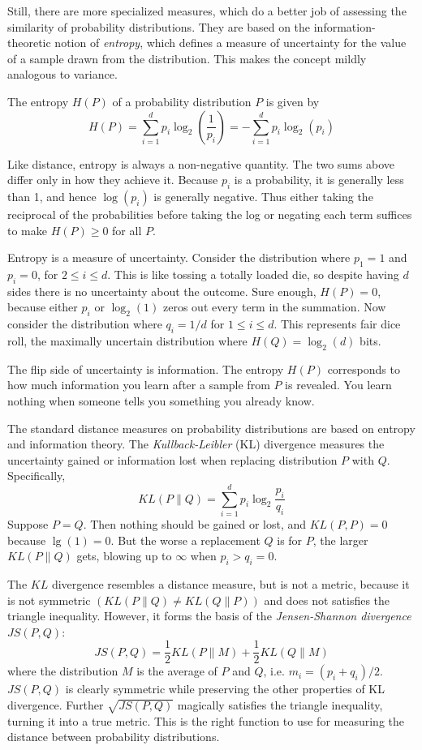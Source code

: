 \documentclass[10pt]{article}
\begin{document}
Still, there are more specialized measures, which do a better job of assessing the similarity of probability distributions. They are based on the information-theoretic notion of \textit{entropy}, which defines a measure of uncertainty for the value of a sample drawn from the distribution. This makes the concept mildly analogous to variance.

The entropy $H(P)$ of a probability distribution $P$ is given by
\[
H(P)=\sum_{i=1}^{d} p_i \log_2\left(\frac{1}{p_i}\right)=-\sum_{i=1}^{d} p_i \log_2(p_i)
\]

Like distance, entropy is always a non-negative quantity. The two sums above differ only in how they achieve it. Because $p_i$ is a probability, it is generally less than 1, and hence $\log(p_i)$ is generally negative. Thus either taking the reciprocal of the probabilities before taking the log or negating each term suffices to make $H(P) \geq 0$ for all $P$.

Entropy is a measure of uncertainty. Consider the distribution where $p_1=1$ and $p_i=0$, for $2 \leq i \leq d$. This is like tossing a totally loaded die, so despite having $d$ sides there is no uncertainty about the outcome. Sure enough, $H(P)=0$, because either $p_i$ or $\log_2(1)$ zeros out every term in the summation. Now consider the distribution where $q_i=1/d$ for $1 \leq i \leq d$. This represents fair dice roll, the maximally uncertain distribution where $H(Q)=\log_2(d)$ bits.

The flip side of uncertainty is information. The entropy $H(P)$ corresponds to how much information you learn after a sample from $P$ is revealed. You learn nothing when someone tells you something you already know.

The standard distance measures on probability distributions are based on entropy and information theory. The \textit{Kullback-Leibler} (KL) divergence measures the uncertainty gained or information lost when replacing distribution $P$ with $Q$. Specifically,
\[
KL(P \| Q)=\sum_{i=1}^{d} p_i \log_2 \frac{p_i}{q_i}
\]
Suppose $P=Q$. Then nothing should be gained or lost, and $KL(P, P)=0$ because $\lg(1)=0$. But the worse a replacement $Q$ is for $P$, the larger $KL(P \| Q)$ gets, blowing up to $\infty$ when $p_i>q_i=0$.

The $KL$ divergence resembles a distance measure, but is not a metric, because it is not symmetric $(KL(P \| Q) \neq KL(Q \| P))$ and does not satisfies the triangle inequality. However, it forms the basis of the \textit{Jensen-Shannon divergence} $JS(P, Q)$:
\[
JS(P, Q)=\frac{1}{2} KL(P \| M)+\frac{1}{2} KL(Q \| M)
\]
where the distribution $M$ is the average of $P$ and $Q$, i.e. $m_i=(p_i+q_i)/2$. $JS(P, Q)$ is clearly symmetric while preserving the other properties of KL divergence. Further $\sqrt{JS(P, Q)}$ magically satisfies the triangle inequality, turning it into a true metric. This is the right function to use for measuring the distance between probability distributions.
\end{document}

